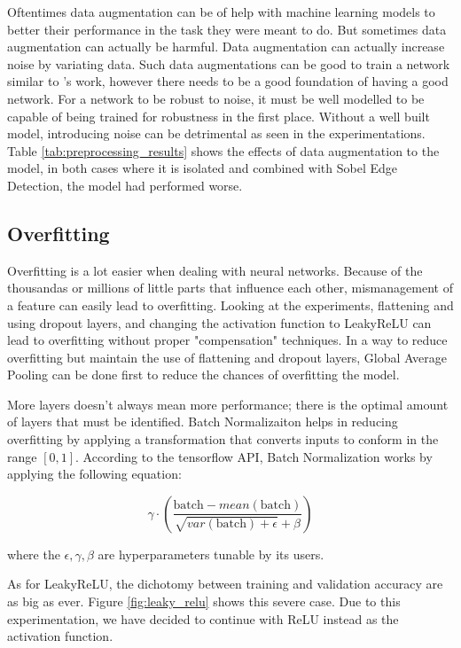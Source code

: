 Oftentimes data augmentation can be of help with machine learning models to better their performance in the task they were meant to do. But sometimes data augmentation can actually be harmful. Data augmentation can actually increase noise by variating data. Such data augmentations can be good to train a network similar to \cite{kim_adaptive_2021}'s work, however there needs to be a good foundation of having a good network. For a network to be robust to noise, it must be well modelled to be capable of being trained for robustness in the first place. Without a well built model, introducing noise can be detrimental as seen in the experimentations. Table \ref{tab:preprocessing_results} shows the effects of data augmentation to the model, in both cases where it is isolated and combined with Sobel Edge Detection, the model had performed worse. 

\subsection{Overfitting}

Overfitting is a lot easier when dealing with neural networks. Because of the thousandas or millions of little parts that influence each other, mismanagement of a feature can easily lead to overfitting. Looking at the experiments, flattening and using dropout layers, and changing the activation function to LeakyReLU can lead to overfitting without proper "compensation" techniques. In a way to reduce overfitting but maintain the use of flattening and dropout layers, Global Average Pooling can be done first to reduce the chances of overfitting the model.

More layers doesn't always mean more performance; there is the optimal amount of layers that must be identified. Batch Normalizaiton helps in reducing overfitting by applying a transformation that converts inputs to conform in the range $[0, 1]$. According to the tensorflow API, Batch Normalization works by applying the following equation:

\[
  \gamma \cdot \left(\frac{\text{batch} - mean(\text{batch})}{\sqrt{var(\text{batch}) + \epsilon} + \beta}\right)
\]

where the $\epsilon, \gamma, \beta$ are hyperparameters tunable by its users. 

As for LeakyReLU, the dichotomy between training and validation accuracy are as big as ever. Figure \ref{fig:leaky_relu} shows this severe case. Due to this experimentation, we have decided to continue with ReLU instead as the activation function. 

